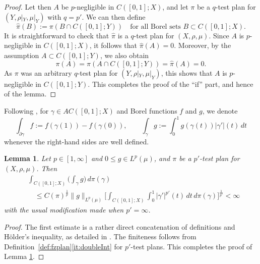 \documentclass[11pt]{amsart}
\newtheorem{lemma}[theorem]{Lemma}
\theoremstyle{definition}
\theoremstyle{remark}
\numberwithin{equation}{section}
\newcommand{\abs}[1]{|#1|}
\newcommand{\Norm}[2]{\|#1\|_{#2}}
\begin{document}
\begin{proof}
Let then $A$ be $p$-negligible in $C([0,1];X)$, and let $\pi$ be a $q$-test plan for
$(Y,\rho|_Y,\mu|_Y)$ with $q=p'$. We can then define
\begin{equation*}
  \hat\pi(B):=\pi(B\cap C([0,1];Y))\quad\text{for all Borel sets }B\subset C([0,1];X).
\end{equation*}
It is straightforward to check that $\hat\pi$ is a $q$-test plan for $(X,\rho,\mu)$.
Since $A$ is $p$-negligible in $C([0,1];X)$, it follows that $\hat\pi(A)=0$.
Moreover, by the assumption $A\subset C([0,1];Y)$, we also obtain
\begin{equation*}
  \pi(A)=\pi(A\cap C([0,1];Y))=\hat\pi(A)=0.
\end{equation*}
As $\pi$ was an arbitrary $q$-test plan for $(Y,\rho|_Y,\mu|_Y)$,
this shows that $A$ is $p$-negligible in $C([0,1];Y)$.
This completes the proof of the ``if'' part, and hence of the lemma.
\end{proof}



Following \cite[Section 4.1]{AGS:13}, for $\gamma\in AC([0,1];X)$
and Borel functions $f$ and $g$, we denote
\begin{equation*}
  \int_{\partial\gamma}f:=f(\gamma(1))-f(\gamma(0)),\qquad
  \int_{\gamma}g:=\int_0^1 g(\gamma(t))\abs{\gamma'}(t)\,dt
\end{equation*}
whenever the right-hand sides are well defined.

\begin{lemma}\label{lem:ACDM4.13}
Let $p\in[1,\infty]$ and $0\leq g\in L^p(\mu)$, and $\pi$ be a $p'$-test plan for
$(X,\rho,\mu)$. Then
\begin{equation*}
\begin{split}
&\int_{C([0,1];X)}\Big(\int_{\gamma}g\Big)\,d\pi(\gamma) \\
&\quad\leq
C(\pi)^{\frac1p}\Norm{g}{L^p(\mu)}\Big[\int_{C([0,1];X)}\int_0^1\abs{\gamma'}^{p'}(t)
\,dt\,d\pi(\gamma)\Big]^{\frac{1}{p'}}
<\infty
\end{split}
\end{equation*}
with the usual modification made when $p'=\infty$.
\end{lemma}

\begin{proof}
The first estimate is a rather direct concatenation of definitions and H\"older's
inequality, as detailed in \cite[(4.13)--(4.14)]{ACDM}. The finiteness follows from
Definition~\ref{def:fzplan}\eqref{it:doubleInt} for $p'$-test plans.
This completes the proof of Lemma \ref{lem:ACDM4.13}.
\end{proof}
\end{document}
